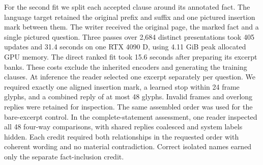 For the second fit we split each accepted clause around its annotated fact. The language target retained the original prefix and suffix and one pictured insertion mark between them. The writer received the original page, the marked fact and a single pictured question. Three passes over 2,684 distinct presentations took 405 updates and 31.4 seconds on one RTX 4090 D, using 4.11 GiB peak allocated GPU memory. The direct ranked fit took 15.6 seconds after preparing its excerpt banks. These costs exclude the inherited encoders and generating the training clauses. At inference the reader selected one excerpt separately per question. We required exactly one aligned insertion mark, a learned stop within 24 frame glyphs, and a combined reply of at most 48 glyphs. Invalid frames and overlong replies were retained for inspection. The same assembled order was used for the bare-excerpt control. In the complete-statement assessment, one reader inspected all 48 four-way comparisons, with shared replies coalesced and system labels hidden. Each credit required both relationships in the requested order with coherent wording and no material contradiction. Correct isolated names earned only the separate fact-inclusion credit.
